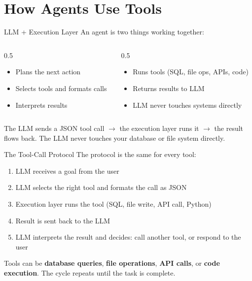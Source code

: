 \documentclass[aspectratio=169]{beamer}
\begin{document}
\section{How Agents Use Tools}

\begin{frame}{LLM + Execution Layer}
An agent is two things working together:
\vspace{0.3cm}
\begin{columns}[T]
\begin{column}{0.5\textwidth}
\begin{shadedbox}[title=\textbf{LLM}]
\begin{itemize}\small
  \item Plans the next action
  \item Selects tools and formats calls
  \item Interprets results
\end{itemize}
\end{shadedbox}
\end{column}
\begin{column}{0.5\textwidth}
\begin{shadedbox}[title=\textbf{Execution Layer}]
\begin{itemize}\small
  \item Runs tools (SQL, file ops, APIs, code)
  \item Returns results to LLM
  \item LLM never touches systems directly
\end{itemize}
\end{shadedbox}
\end{column}
\end{columns}
\vspace{0.3cm}
The LLM sends a JSON tool call $\rightarrow$ the execution layer runs it $\rightarrow$ the result flows back.  The LLM \alert{never touches your database or file system directly}.
\end{frame}

\begin{frame}{The Tool-Call Protocol}
The protocol is the same for every tool:
\vspace{0.3cm}
\begin{enumerate}
  \item LLM receives a goal from the user
  \item LLM selects the right tool and formats the call as JSON
  \item Execution layer runs the tool (SQL, file write, API call, Python)
  \item Result is sent back to the LLM
  \item LLM interprets the result and decides: call another tool, or respond to the user
\end{enumerate}
\vspace{0.3cm}
Tools can be \textbf{database queries}, \textbf{file operations}, \textbf{API calls}, or \textbf{code execution}.  The cycle repeats until the task is complete.
\end{frame}
\end{document}
